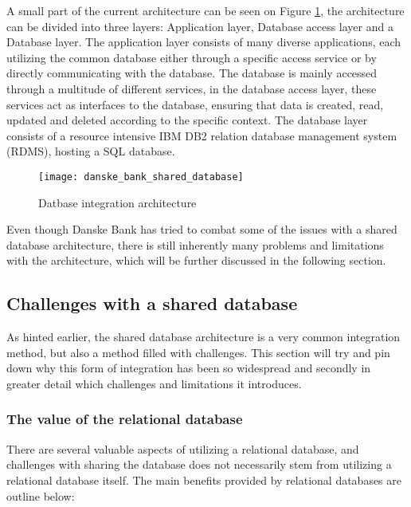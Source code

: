 A small part of the current architecture can be seen on Figure \ref{fig:danske_bank_shared_database}, the architecture can be divided into three layers: Application layer, Database access layer and a Database layer. The application layer consists of many diverse applications, each utilizing the common database either through a specific access service or by directly communicating with the database. The database is mainly accessed through a multitude of different services, in the database access layer, these services act as interfaces to the database, ensuring that data is created, read, updated and deleted according to the specific context. The database layer consists of a resource intensive IBM DB2 relation database management system (RDMS), hosting a SQL database. 


\begin{figure}[!htb]
  \texttt{[image: danske\_bank\_shared\_database]}  
  \caption{Datbase integration architecture}
  \label{fig:danske_bank_shared_database}
\end{figure}


Even though Danske Bank has tried to combat some of the issues with a shared database architecture, there is still inherently many problems and limitations with the architecture, which will be further discussed in the following section.

\subsection{Challenges with a shared database}
As hinted earlier, the shared database architecture is a very common integration method\cite[p.~41]{newman2015microservices}, but also a method filled with challenges\cite[t.~10:36]{fowler2014microservicesoamonolith}. This section will try and pin down why this form of integration has been so widespread and secondly in greater detail which challenges and limitations it introduces.

\subsubsection{The value of the relational database}
There are several valuable aspects of utilizing a relational database, and challenges with sharing the database does not necessarily stem from utilizing a relational database itself. The main benefits provided by relational databases are outline below:

